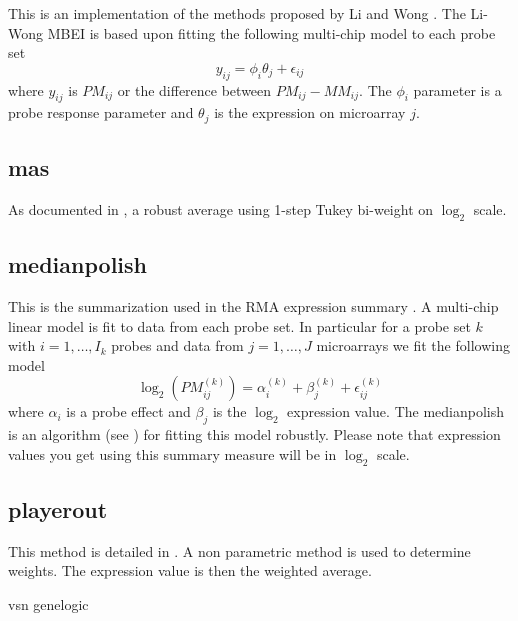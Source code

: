 This is an implementation of the methods proposed by Li and Wong \cite{PMID_11134512,PMID_11532216}. The Li-Wong MBEI is based upon fitting the following multi-chip model to each probe set
\begin{equation}
y_{ij} = \phi_i \theta_j + \epsilon_{ij}
\end{equation}
where $y_{ij}$ is $PM_{ij}$ or the difference between $PM_{ij}-MM_{ij}$. The $\phi_i$ parameter is a probe response parameter and $\theta_j$ is the expression on microarray $j$.


\subsection{mas}

As documented in \cite{affy:tech:2002}, a robust average using 1-step Tukey bi-weight on $\log_2$ scale.

\subsection{medianpolish}

This is the summarization used in the RMA expression summary \cite{PMID_12582260,PMID_12925520}. A multi-chip linear model is fit to data from each probe set. In particular for a probe set $k$ with $i=1,\dots,I_k$ probes and data from $j=1,\dots,J$ microarrays we fit the following model
\begin{equation*}
\log_2\left(PM^{(k)}_{ij}\right) = \alpha_i^{(k)} + \beta_j^{(k)} + \epsilon_{ij}^{(k)}
\end{equation*}
where $\alpha_i$ is a probe effect and $\beta_j$ is the $\log_2$ expression value. The medianpolish is an algorithm (see \cite{tukey:1977}) for fitting this model robustly. Please note that expression values you get using this summary measure will be in $\log_2$ scale.

\subsection{playerout}

This method is detailed in \cite{Lazardis:etal:2002}. A non parametric method is used to determine weights. The expression value is then the weighted average.

vsn			\cite{PMID_12169536}
genelogic		\cite{PMID_17059591}

